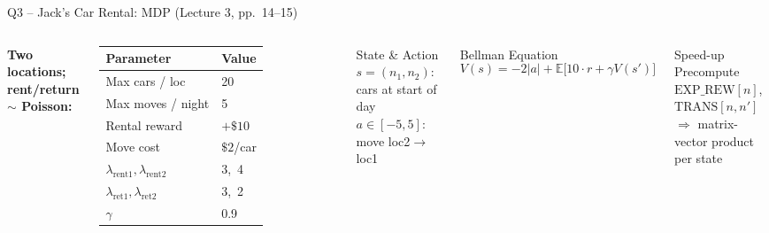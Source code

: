 \documentclass[aspectratio=169,12pt]{beamer}
\newcommand{\E}{\mathbb{E}}
\begin{document}
\begin{frame}{Q3 -- Jack's Car Rental: MDP (Lecture 3, pp.~14--15)}
  \begin{columns}[T]
    \textbf{Two locations; rent/return $\sim$ Poisson:}\\[4pt]

    \begin{tabular}{ll}
      \toprule
      Parameter & Value \\
      \midrule
      Max cars / loc & 20 \\
      Max moves / night & 5 \\
      Rental reward & $+\$10$ \\
      Move cost & $\$2$/car \\
      $\lambda_{\text{rent1}},\lambda_{\text{rent2}}$ & 3,\ 4 \\
      $\lambda_{\text{ret1}},\lambda_{\text{ret2}}$ & 3,\ 2 \\
      $\gamma$ & 0.9 \\
      \bottomrule
    \end{tabular}

    \begin{block}{State \& Action}
      $s=(n_1,n_2)$: cars at start of day\\
      $a\in[-5,5]$: move loc2$\to$loc1
    \end{block}

    \begin{block}{Bellman Equation}
      \scriptsize
      \[
        V(s) = {-2|a|}+\E\!\bigl[10\cdot r + \gamma V(s')\bigr]
      \]
    \end{block}

    \begin{alertblock}{Speed-up}
      \scriptsize
      Precompute $\text{EXP\_REW}[n]$, $\text{TRANS}[n,n']$\\
      $\Rightarrow$ matrix-vector product per state
    \end{alertblock}
  \end{columns}
\end{frame}
\end{document}
